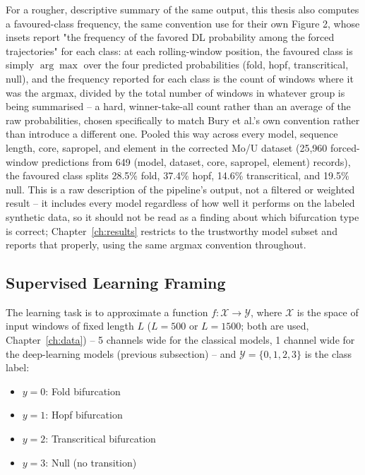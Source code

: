 \begin{enumerate}
For a rougher, descriptive summary of the same output, this thesis also computes a favoured-class frequency, the same convention \citet{bury2021} use for their own Figure 2, whose insets report "the frequency of the favored DL probability among the forced trajectories" for each class: at each rolling-window position, the favoured class is simply $\arg\max$ over the four predicted probabilities (fold, hopf, transcritical, null), and the frequency reported for each class is the count of windows where it was the argmax, divided by the total number of windows in whatever group is being summarised -- a hard, winner-take-all count rather than an average of the raw probabilities, chosen specifically to match Bury et al.'s own convention rather than introduce a different one. Pooled this way across every model, sequence length, core, sapropel, and element in the corrected Mo/U dataset (25{,}960 forced-window predictions from 649 (model, dataset, core, sapropel, element) records), the favoured class splits 28.5\% fold, 37.4\% hopf, 14.6\% transcritical, and 19.5\% null. This is a raw description of the pipeline's output, not a filtered or weighted result -- it includes every model regardless of how well it performs on the labeled synthetic data, so it should not be read as a finding about which bifurcation type is correct; Chapter~\ref{ch:results} restricts to the trustworthy model subset and reports that properly, using the same argmax convention throughout.
\end{enumerate}

\subsection{Supervised Learning Framing}

The learning task is to approximate a function $f: \mathcal{X} \rightarrow \mathcal{Y}$, where $\mathcal{X}$ is the space of input windows of fixed length $L$ ($L=500$ or $L=1500$; both are used, Chapter~\ref{ch:data}) -- 5 channels wide for the classical models, 1 channel wide for the deep-learning models (previous subsection) -- and $\mathcal{Y} = \{0,1,2,3\}$ is the class label:

\begin{itemize}
    \item $y=0$: Fold bifurcation
    \item $y=1$: Hopf bifurcation
    \item $y=2$: Transcritical bifurcation
    \item $y=3$: Null (no transition)
\end{itemize}

